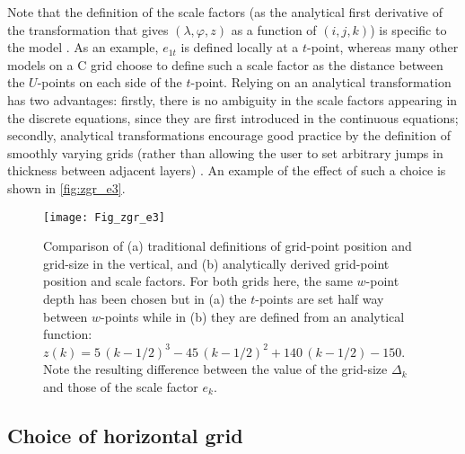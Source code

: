 \documentclass[../main/NEMO_manual]{subfiles}
\begin{document}
Note that the definition of the scale factors
(\ie as the analytical first derivative of the transformation that
gives $(\lambda,\varphi,z)$ as a function of $(i,j,k)$)
is specific to the \NEMO model \citep{Marti_al_JGR92}.
As an example, $e_{1t}$ is defined locally at a $t$-point,
whereas many other models on a C grid choose to define such a scale factor as
the distance between the $U$-points on each side of the $t$-point.
Relying on an analytical transformation has two advantages:
firstly, there is no ambiguity in the scale factors appearing in the discrete equations,
since they are first introduced in the continuous equations;
secondly, analytical transformations encourage good practice by the definition of smoothly varying grids
(rather than allowing the user to set arbitrary jumps in thickness between adjacent layers) \citep{Treguier1996}.
An example of the effect of such a choice is shown in \autoref{fig:zgr_e3}.
\begin{figure}[!t]
  \begin{center}
    \texttt{[image: Fig\_zgr\_e3]}
    \caption{
      \protect\label{fig:zgr_e3}
      Comparison of (a) traditional definitions of grid-point position and grid-size in the vertical,
      and (b) analytically derived grid-point position and scale factors.
      For both grids here,
      the same $w$-point depth has been chosen but in (a) the $t$-points are set half way between $w$-points while
      in (b) they are defined from an analytical function: $z(k)=5\,(k-1/2)^3 - 45\,(k-1/2)^2 + 140\,(k-1/2) - 150$.
      Note the resulting difference between the value of the grid-size $\Delta_k$ and
      those of the scale factor $e_k$.
    }
  \end{center}
\end{figure}

\subsection{Choice of horizontal grid}
\label{subsec:DOM_hgr_msh_choice}


\end{document}
